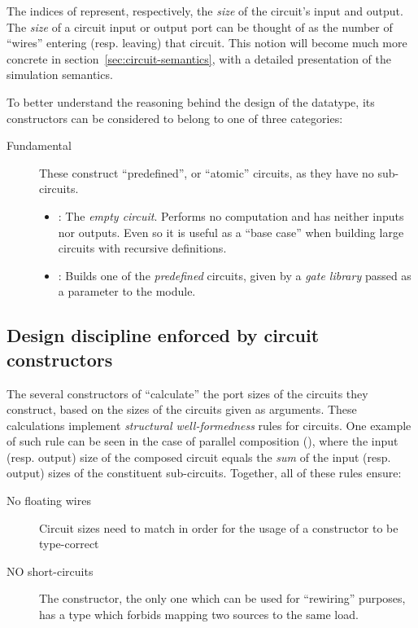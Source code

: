         The indices of  represent, respectively, the \emph{size} of the circuit's input and output.
        The \emph{size} of a circuit input or output port can be thought of
        as the number of ``wires'' entering (resp. leaving) that circuit.
        This notion will become much more concrete in section~\ref{sec:circuit-semantics}, with
        a detailed presentation of the simulation semantics.

        To better understand the reasoning behind the design of the  datatype,
        its constructors can be considered to belong to one of three categories:

        \begin{description}
            \item[Fundamental] These construct ``predefined'', or ``atomic'' circuits, as they have no sub-circuits.
                \begin{itemize}
                    \item {}: The \emph{empty circuit}. Performs no computation and has neither inputs nor outputs.
                        Even so it is useful as a ``base case'' when building large circuits with recursive definitions.
                    \item {}: Builds one of the \emph{predefined} circuits, given by a \emph{gate library}
                        passed as a parameter to the  module.
                \end{itemize}

        \end{description}

        \subsection{Design discipline enforced by circuit constructors}
            The several constructors of  ``calculate'' the port sizes of the circuits they construct,
            based on the sizes of the circuits given as arguments.
            These calculations implement \emph{structural well-formedness} rules for circuits.
            One example of such rule can be seen in the case of parallel composition (),
            where the input (resp. output) size of the composed circuit equals the \emph{sum}
            of the input (resp. output) sizes of the constituent sub-circuits.
            Together, all of these rules ensure:

            \begin{description}
                \item[No floating wires] Circuit sizes need to match in order for the usage of a constructor
                    to be type-correct
                \item [NO short-circuits] The  constructor, the only one which can be used for
                    ``rewiring'' purposes, has a type which forbids mapping two sources to the same load.
            \end{description}


